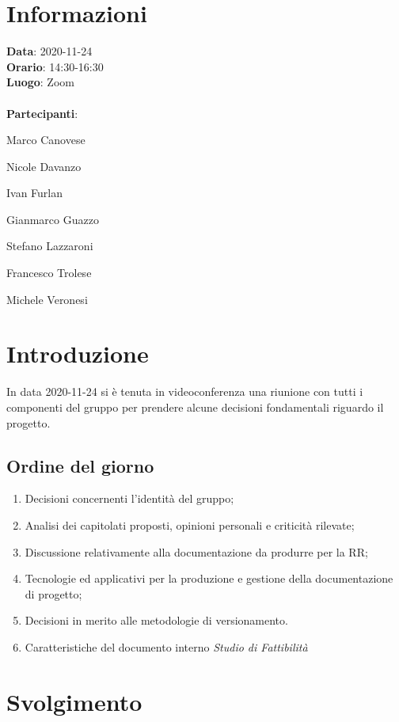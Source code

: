 \section{Informazioni}
\textbf{Data}: 2020-11-24\\
\textbf{Orario}: 14:30-16:30\\
\textbf{Luogo}: Zoom\\\\
\textbf{Partecipanti}:\begin{list}{*}{\setlength{\itemsep}{0cm}}
	\item Marco Canovese
	\item Nicole Davanzo
	\item Ivan Furlan
	\item Gianmarco Guazzo
	\item Stefano Lazzaroni
	\item Francesco Trolese
	\item Michele Veronesi
\end{list}

\section{Introduzione}
In data 2020-11-24 si è tenuta in videoconferenza una riunione con tutti i componenti del gruppo per prendere alcune decisioni fondamentali riguardo il progetto.

\subsection{Ordine del giorno}
\begin{enumerate}
    \item Decisioni concernenti l'identità del gruppo;
    \item Analisi dei capitolati proposti, opinioni personali e criticità rilevate;
    \item Discussione relativamente alla documentazione da produrre per la RR;
    \item Tecnologie ed applicativi per la produzione e gestione della documentazione di progetto;
    \item Decisioni in merito alle metodologie di versionamento.
	\item Caratteristiche del documento interno \textit{Studio di Fattibilità}
\end{enumerate}

\section{Svolgimento}

